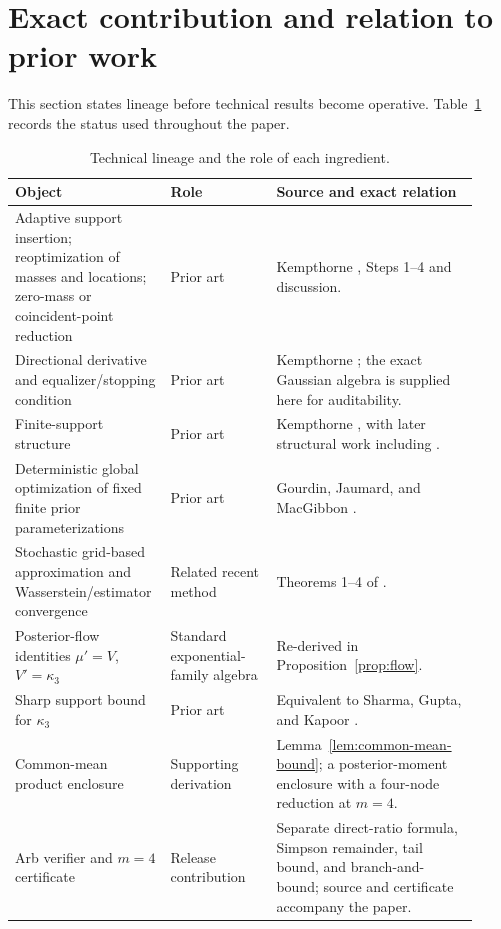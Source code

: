\section{Exact contribution and relation to prior work}
\label{sec:lineage}

This section states lineage before technical results become operative.
Table~\ref{tab:lineage} records the status used throughout the paper.

\begin{table}[ht]
\centering
\caption{Technical lineage and the role of each ingredient.}
\label{tab:lineage}
\small
\begin{tabular}{p{0.28\linewidth}p{0.22\linewidth}p{0.42\linewidth}}
\toprule
Object & Role & Source and exact relation \\
\midrule
Adaptive support insertion; reoptimization of masses and locations; zero-mass
or coincident-point reduction & Prior art &
Kempthorne \cite[pp.~175--177]{kempthorne1987}, Steps 1--4 and discussion.\\
Directional derivative and equalizer/stopping condition & Prior art &
Kempthorne \cite[Theorems 2.1--2.2, pp.~172--174]{kempthorne1987}; the exact
Gaussian algebra is supplied here for auditability.\\
Finite-support structure & Prior art &
Kempthorne \cite[Theorem 2.4, p.~175]{kempthorne1987}, with later structural
work including \cite{dytso2018,dytso2022}.\\
Deterministic global optimization of fixed finite prior parameterizations &
Prior art &
Gourdin, Jaumard, and MacGibbon \cite[Sections 2--3]{gourdin1994}.\\
Stochastic grid-based approximation and Wasserstein/estimator convergence &
Related recent method &
Theorems 1--4 of \cite{montielzubova2026}.\\
Posterior-flow identities $\mu'=V$, $V'=\kappa_3$ & Standard exponential-family
algebra & Re-derived in Proposition~\ref{prop:flow}.\\
Sharp support bound for $\kappa_3$ & Prior art &
Equivalent to Sharma, Gupta, and Kapoor
\cite[Theorem 2.2 and (2.20)--(2.21)]{sharma2010}.\\
Common-mean product enclosure & Supporting derivation &
Lemma~\ref{lem:common-mean-bound}; a posterior-moment enclosure with a
four-node reduction at $m=4$.\\
Arb verifier and $m=4$ certificate & Release contribution &
Separate direct-ratio formula, Simpson remainder, tail bound, and
branch-and-bound; source and certificate accompany the paper.\\
\bottomrule
\end{tabular}
\end{table}

